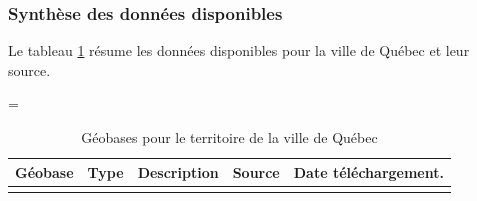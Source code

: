    \subsubsection{Synthèse des données disponibles}
      Le tableau \ref{tab:donnees_disponibles_Québec} résume les données disponibles pour la ville de Québec et leur source.
      \begin{landscape}
        \LTcapwidth=\textwidth
      \begin{longtable}[h!]{p{.2 \linewidth} p{.1 \linewidth} p{.3 \linewidth} p{.15\linewidth} p{.125\linewidth} }
        
        
        \hline
        Géobase & Type & Description  & Source & Date téléchargement.\\ 
        \hline
        \hline
        \endhead
        \hline
        \endfoot
        \hline
        \caption{Géobases pour le territoire de la ville de Québec}
        \label{tab:donnees_disponibles_Québec}
        \endlastfoot
        

\end{longtable}
\end{landscape}

